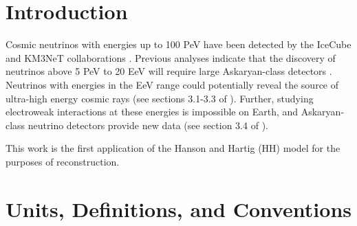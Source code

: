 \documentclass[amsmath,amssymb,aps,prd,10pt,twocolumn,showkeys]{revtex4}
\begin{document}
\section{Introduction}

Cosmic neutrinos with energies up to 100 PeV have been detected by the IceCube and KM3NeT collaborations \cite{10.1126/science.1242856,aartsen2013first-bff,collaboration2016observation-03b,collaboration2018neutrino-2a0,collaboration2021detection-6fa,collaboration2022evidence-a08,collaboration2023observation-08b,collaboration2025observation-22f}. Previous analyses indicate that the discovery of neutrinos above 5 PeV to 20 EeV will  require large Askaryan-class detectors \cite{10.1103/physrevd.98.062003}.  Neutrinos with energies in the EeV range could potentially reveal the source of ultra-high energy cosmic rays (see sections 3.1-3.3 of \cite{10.48550/arxiv.2008.04323}).  Further, studying electroweak interactions at these energies is impossible on Earth, and Askaryan-class neutrino detectors provide new data (see section 3.4 of \cite{10.48550/arxiv.2008.04323}).

This work is the first application of the Hanson and Hartig (HH) model for the purposes of reconstruction.


\section{Units, Definitions, and Conventions}
\label{sec:unit}
\end{document}
